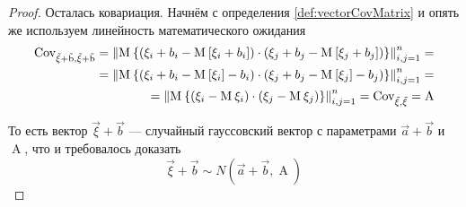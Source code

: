 \begin{proof}
  Осталась ковариация. Начнём с определения \ref{def:vectorCovMatrix} и опять же
  используем линейность математического ожидания
  \begin{align*}
      \operatorname{Cov^{}_{\vec{\xi} + \vec{b}, \vec{\xi} + \vec{b}}}
      = \left\| \operatorname{M}_{} 
      \left\{ \left( \xi_i + b_i - \operatorname{M}_{} \left[ \xi_i + b_i \right] \right)
          \cdot \left( \xi_j + b_j - \operatorname{M}_{} \left[ \xi_j + b_j \right] \right)
      \right\} \right\|_{i,j=1}^n = \\
      = \left\| \operatorname{M}_{} 
      \left\{ \left( \xi_i + b_i - \operatorname{M}_{} \left[ \xi_i \right] - b_i \right)
          \cdot \left( \xi_j + b_j - \operatorname{M}_{} \left[ \xi_j \right] - b_j \right)
      \right\} \right\|_{i,j=1}^n = \\
      = \left\| \operatorname{M}_{} 
      \left\{ \left( \xi_i - \operatorname{M}_{} \xi_i \right)
          \cdot \left( \xi_j - \operatorname{M}_{} \xi_j \right)
      \right\} \right\|_{i,j=1}^n
      = \operatorname{Cov^{}_{\vec{\xi}, \vec{\xi}}} = \operatorname{A}
  \end{align*}

  То есть вектор $\vec{\xi} + \vec{b}$ --- случайный гауссовский вектор с
  параметрами $\vec{a} + \vec{b}$ и $\operatorname{A}$, что и требовалось доказать
  $$\vec{\xi} + \vec{b} \sim N\left( \vec{a} + \vec{b}, \operatorname{A} \right)$$
\end{proof}

